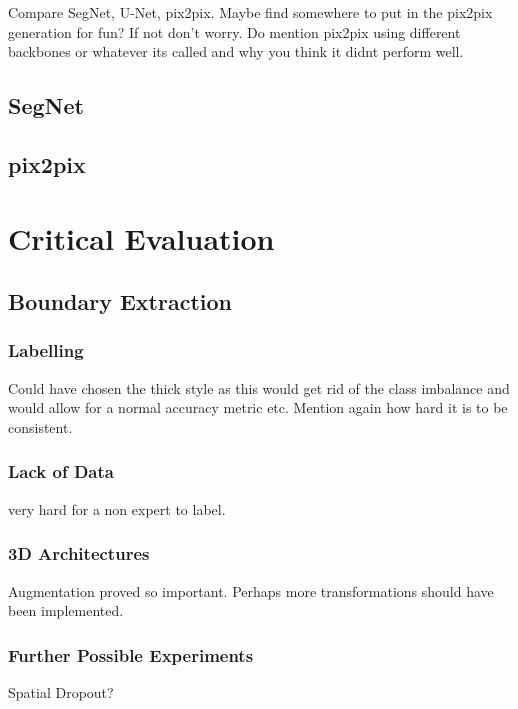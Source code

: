 Compare SegNet, U-Net, pix2pix. Maybe find somewhere to put in the pix2pix generation for fun? If not don't worry. Do mention pix2pix using different backbones or whatever its called and why you think it didnt perform well.

\subsection{SegNet}

\subsection{pix2pix}



\section{Critical Evaluation}

\subsection{Boundary Extraction}

\subsubsection{Labelling}

Could have chosen the thick style as this would get rid of the class imbalance and would allow for a normal accuracy metric etc. Mention again how hard it is to be consistent.

\subsubsection{Lack of Data}

very hard for a non expert to label.

\subsubsection{3D Architectures}

Augmentation proved so important. Perhaps more transformations should have been implemented.

\subsubsection{Further Possible Experiments}

Spatial Dropout?

